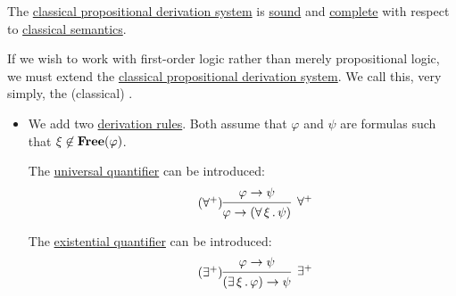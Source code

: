 \begin{proposition}
\begin{proposition}
\begin{theorem}\label{thm:classical_propositional_logic_is_sound_and_complete}
  The \hyperref[def:propositional_derivation_system]{classical propositional derivation system} is \hyperref[def:derivability_and_satisfiability/soundness]{sound} and \hyperref[def:derivability_and_satisfiability/completeness]{complete} with respect to \hyperref[def:propositional_semantics]{classical semantics}.
\end{theorem}

\begin{definition}\label{def:first_order_derivation_system}
  If we wish to work with first-order logic rather than merely propositional logic, we must extend the \hyperref[def:propositional_derivation_system]{classical propositional derivation system}. We call this, very simply, the (classical) .

  \begin{itemize}
    \item{} We add two \hyperref[def:proof_derivation_system/rules]{derivation rules}. Both assume that \( \varphi \) and \( \psi \) are formulas such that \( \xi \not\in \operatorname{\mathbf{Free}}(\varphi) \).

    \begin{thmenum}[series=def:first_order_derivation_system]
       The \hyperref[def:first_order_language/quantifiers/universal]{universal quantifier} can be introduced:
      \begin{equation}\label{eq:def:first_order_derivation_system/rules/forall_intro}
        \tag{\( \forall^+ \)}
        \begin{prooftree}
          \hypo{\varphi \rightarrow \psi}
          \infer1[\( \forall^+ \)]{\varphi \rightarrow (\qforall \xi \psi)}
        \end{prooftree}
      \end{equation}

       The \hyperref[def:first_order_language/quantifiers/existential]{existential quantifier} can be introduced:
      \begin{equation}\label{eq:def:first_order_derivation_system/rules/exists_intro}
        \tag{\( \exists^+ \)}
        \begin{prooftree}
          \hypo{\varphi \rightarrow \psi}
          \infer1[\( \exists^+ \)]{(\qexists \xi \varphi) \rightarrow \psi}
        \end{prooftree}
      \end{equation}
    \end{thmenum}


\end{itemize}
\end{definition}
\end{proposition}
\end{proposition}
